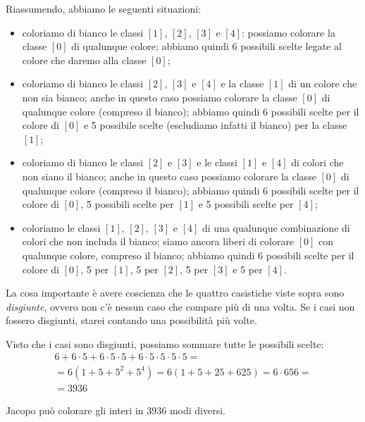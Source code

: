 \begin{soluzione}
    Riassumendo, abbiamo le seguenti situazioni:
    \begin{itemize}
        \item coloriamo di bianco le classi $[1]$, $[2]$, $[3]$ e $[4]$:
        possiamo colorare la classe $[0]$ di qualunque colore;
        abbiamo quindi 6 possibili scelte legate al colore che daremo alla classe $[0]$;
        \item coloriamo di bianco le classi $[2]$, $[3]$ e $[4]$ e la classe $[1]$ di un colore che non sia bianco;
        anche in questo caso possiamo colorare la classe $[0]$ di qualunque colore (compreso il bianco);
        abbiamo quindi 6 possibili scelte per il colore di $[0]$ e 5 possibile scelte (escludiamo infatti il bianco)
        per la classe $[1]$;
        \item coloriamo di bianco le classi $[2]$ e $[3]$ e le classi $[1]$ e $[4]$ di colori che non siano il bianco;
        anche in questo caso possiamo colorare la classe $[0]$ di qualunque colore (compreso il bianco);
        abbiamo quindi 6 possibili scelte per il colore di $[0]$, 5 possibili scelte per $[1]$ e 5 possibili scelte
        per $[4]$;
        \item coloriamo le classi $[1]$, $[2]$, $[3]$ e $[4]$ di una qualunque combinazione di colori che non includa
        il bianco;
        siamo ancora liberi di colorare $[0]$ con qualunque colore, compreso il bianco;
        abbiamo quindi 6 possibili scelte per il colore di $[0]$, 5 per $[1]$, 5 per $[2]$, 5 per $[3]$ e 5 per $[4]$.
    \end{itemize}

    La cosa importante è avere coscienza che le quattro casistiche viste sopra sono \emph{disgiunte}, ovvero non c'è
    nessun caso che compare più di una volta.
    Se i casi non fossero disgiunti, starei contando una possibilità più volte.

    Visto che i casi sono disgiunti, possiamo sommare tutte le possibili scelte:
    \begin{multline*}
        6 + 6 \cdot 5 + 6 \cdot 5 \cdot 5 + 6 \cdot 5 \cdot 5 \cdot 5 \cdot 5 = \\
        = 6(1 + 5 + 5^2 + 5^4) = 6(1 + 5 + 25 + 625) = 6 \cdot 656 = \\
        = 3936
    \end{multline*}

    \bigskip
    Jacopo può colorare gli interi in 3936 modi diversi.
\end{soluzione}

